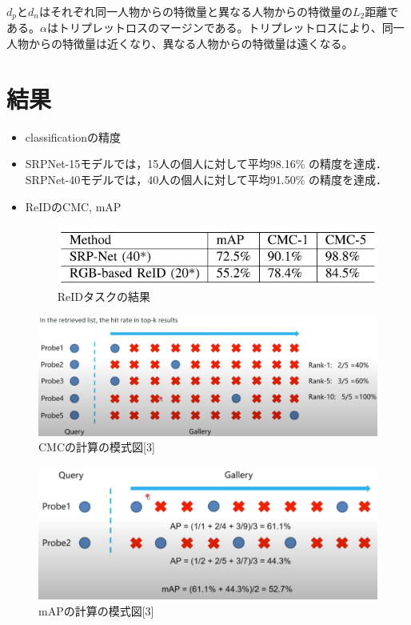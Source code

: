 \documentclass[dvipdfmx]{jsarticle}
\begin{document}
$d_p$と$d_n$はそれぞれ同一人物からの特徴量と異なる人物からの特徴量の$L_2$距離である。$\alpha$はトリプレットロスのマージンである。トリプレットロスにより、同一人物からの特徴量は近くなり、異なる人物からの特徴量は遠くなる。
\section{結果}
\begin{itemize}
    \item classificationの精度
    \item 
SRPNet-15モデルでは，15人の個人に対して平均98.16\% の精度を達成．SRPNet-40モデルでは，40人の個人に対して平均91.50\% の精度を達成．
    \item ReIDのCMC, mAP

\begin{figure}[htbp]
\begin{center}
\includegraphics[width=0.8\linewidth]{./img/ReID_result.png}
\end{center}
\caption{ReIDタスクの結果}
\end{figure}
\end{itemize}
\begin{figure}[htbp]
\begin{center}
\includegraphics[width=0.8\linewidth]{./img/cmc.png}
\end{center}
\caption{CMCの計算の模式図[3]}
\end{figure}

\begin{figure}[htbp]
\begin{center}
\includegraphics[width=0.8\linewidth]{./img/mAP.png}
\end{center}
\caption{mAPの計算の模式図[3]}
\end{figure}
\end{document}
